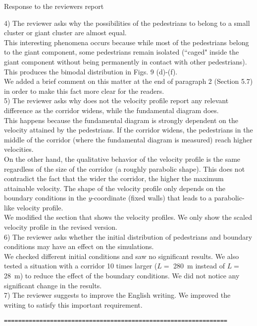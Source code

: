 \documentclass[a4paper,12pt]{letter}
\begin{document}
\begin{letter}{Response to the reviewers report}
{4) The reviewer asks why the possibilities of the pedestrians to belong to a small cluster or giant cluster are almost equal. \\

This interesting phenomena occurs because while most of the pedestrians belong to the giant component, some pedestrians remain isolated (``caged" inside the giant component without being permanently in contact with other pedestrians). This produces the bimodal distribution in Figs. 9 (d)-(f).\\

We added a brief comment on this matter at the end of paragraph 2 (Section 5.7) in order to make this fact more clear for the readers.  \\ 

5) The reviewer asks why does not the velocity profile report any relevant difference as the corridor widens, while the fundamental diagram does.\\

This happens because the fundamental diagram is strongly dependent on the velocity attained by the pedestrians. If the corridor widens, the pedestrians in the middle of the corridor (where the fundamental diagram is measured) reach higher velocities. \\

On the other hand, the qualitative behavior of the velocity profile is the same regardless of the size of the corridor (a roughly parabolic shape). This does not contradict the fact that the wider the corridor, the higher the maximum attainable velocity. The shape of the velocity profile only depends on the boundary conditions in the $y$-coordinate (fixed walls) that leads to a parabolic-like velocity profile. \\

We modified the section that shows the velocity profiles.  We only show the scaled velocity profile in the revised version. \\

6) The reviewer asks whether the initial distribution of pedestrians and boundary conditions may have an effect on the simulations.\\

We checked different initial conditions and saw no significant results. We also tested a situation with a corridor 10 times larger ($L =$ 280~m instead of $L =$ 28~m) to reduce the effect of the boundary conditions. We did not notice any significant change in the results. \\

7) The reviewer suggests to improve the English writing. We improved the writing to satisfy this important requirement.  \\

\begin{verbatim}
===============================================================
\end{verbatim}

}




\end{letter}
\end{document}
